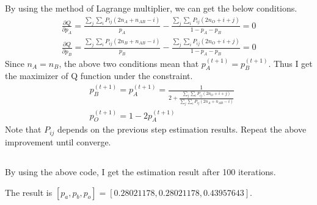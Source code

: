 \documentclass{article}
\begin{document}
		By using the method of Lagrange multiplier, we can get the below conditions.
		\begin{align*}
			\frac{\partial Q}{\partial p_A} = \frac{\sum_j \sum_i P_{ij} (2n_A + n_{AB} -i)}{p_A} - \frac{\sum_j \sum_i P_{ij} (2n_O + i + j)}{1 - p_A - p_B} = 0 \\[10pt]
			\frac{\partial Q}{\partial p_B} = \frac{\sum_j \sum_i P_{ij} (2n_B + n_{AB} -i)}{p_B} - \frac{\sum_j \sum_i P_{ij} (2n_O + i + j)}{1 - p_A - p_B} = 0
		\end{align*}
		Since $n_A = n_B$, the above two conditions mean that $p_A^{(t +1)} = p_B^{(t+1)}$. Thus I get the maximizer of Q function under the constraint.
		\begin{align*}
			&p_B^{(t+1)} = p_A^{(t+1)} = \frac{1}{2 + \frac{\sum_j \sum_i P_{ij} (2n_O + i + j)}{\sum_j \sum_i P_{ij} (2n_A + n_{AB} - i)}}\\[10pt]
			&p_O^{(t+1)} = 1 - 2 p_A^{(t+1)}
		\end{align*}
		Note that $P_{ij}$ depends on the previous step estimation results.
		Repeat the above improvement until converge.
	\subsection{}
	By using the above code, I get the estimation result after 100 iterations. \par The result is $[p_a, p_b, p_o] = [ 0.28021178,  0.28021178,  0.43957643]$.
\section{}
\end{document}
